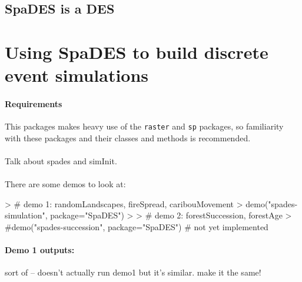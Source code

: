 \documentclass{article}
\begin{document}
\subsection{SpaDES is a DES}

\newpage

\section{Using SpaDES to build discrete event simulations}

\paragraph{Requirements}
This packages makes heavy use of the \texttt{raster} and \texttt{sp} packages, so familiarity with these packages and their classes and methods is recommended.

\paragraph{}
Talk about spades and simInit.

\paragraph{}
There are some demos to look at:

\begin{Schunk}
\begin{Sinput}
> # demo 1: randomLandscapes, fireSpread, caribouMovement
> demo("spades-simulation", package="SpaDES")
>
> # demo 2: forestSuccession, forestAge
> #demo("spades-succession", package="SpaDES") # not yet implemented
\end{Sinput}
\end{Schunk}

\paragraph{Demo 1 outputs:}
sort of -- doesn't actually run demo1 but it's similar. make it the same!
\end{document}
